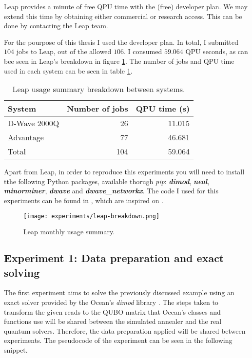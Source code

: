 Leap provides a minute of free QPU time with the (free) developer plan. We may extend this time by obtaining either commercial or research access. This can be done by contacting the Leap team.

For the pourpose of this thesis I used the developer plan. In total, I submitted $104$ jobs to Leap, out of the allowed $106$. I consumed $59.064$ QPU seconds, as can bee seen in Leap's breakdown in figure \ref{fig:leap-breakdown}. The number of jobs and QPU time used in each system can be seen in table \ref{tab:leap-breakdown}.

\begin{table}[H]
	\centering
	\begin{tabular}{lrr}
		\textbf{System} & \textbf{Number of jobs} & \textbf{QPU time (s)} \\
		\hline
		D-Wave 2000Q	& 26	& 11.015	\\
		Advantage		& 77	& 46.681	\\
		Total			& 104	& 59.064                     
	\end{tabular}
	\caption{Leap usage summary breakdown between systems.}
	\label{tab:leap-breakdown}
\end{table}

Apart from Leap, in order to reproduce this experiments you will need to install tthe following Python packages, available thorugh \emph{pip}: \textbf{\emph{dimod}}, \textbf{\emph{neal}}, \textbf{\emph{minorminer}}, \textbf{\emph{dwave}} and \textbf{\emph{dwave\_networkx}}. The code I used for this experiments can be found in \cite{thesis-code}, which are inspired on \cite{Sarkar2020}.

\begin{figure}[H]
	\texttt{[image: experiments/leap-breakdown.png]}
	\centering
	\caption{Leap monthly usage summary.}
	\label{fig:leap-breakdown}
\end{figure}


\subsection{Experiment 1: Data preparation and exact solving}


The first experiment aims to solve the previously discussed example using an exact solver provided by the Ocean's \emph{dimod} library \cite{Dimod}. The steps taken to transform the given reads to the QUBO matrix that Ocean's classes and functions use will be shared between the simulated annealer and the real quantum solvers. Therefore, the data preparation applied will be shared between experiments. The pseudocode of the experiment can be seen in the following snippet.

